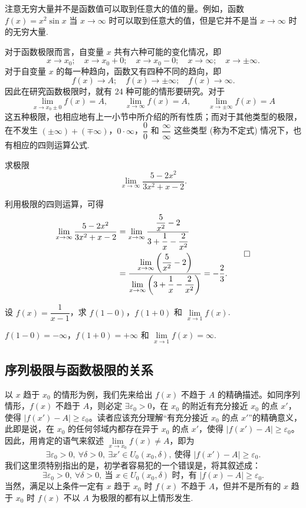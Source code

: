 注意无穷大量并不是函数值可以取到任意大的值的量。例如，函数 $f(x)=x^2\sin x$ 当 $x\to\infty$ 时可以取到任意大的值，但是它并不是当 $x\to\infty$ 时的无穷大量.

对于函数极限而言，自变量 $x$ 共有六种可能的变化情况，即
\[
  x\to x_0;\quad x\to x_0+0;\quad x\to x_0-0;\quad x\to\infty;\quad x\to\pm\infty.
\]
对于自变量 $x$ 的每一种趋向，函数又有四种不同的趋向，即
\[
  f(x)\to A;\quad f(x)\to\pm\infty;\quad f(x)\to\infty.
\]
因此在研究函数极限时，就有 24 种可能的情形要研究。对于
\[
  \lim_{x\to x_0\pm0}f(x)=A,\qquad
  \lim_{x\to\infty}f(x)=A,\qquad
  \lim_{x\to\pm\infty}f(x)=A
\]
这五种极限，也相应地有上一小节中所介绍的所有性质；而对于其他类型的极限，在不发生 $(\pm\infty)+(\mp\infty)$，$0\cdot\infty$，$\dfrac00$ 和 $\dfrac{\infty}{\infty}$ 这些类型 (称为不定式) 情况下，也有相应的四则运算公式.

\begin{example}\label{example:ma-3-1-10}
求极限
\[
  \lim_{x\to\infty}\frac{5-2x^2}{3x^2+x-2}.
\]
\end{example}


\begin{solve}
利用极限的四则运算，可得
\[
\begin{aligned}
  \lim_{x\to\infty}\frac{5-2x^2}{3x^2+x-2}
  &=\lim_{x\to\infty}\frac{\dfrac5{x^2}-2}{3+\dfrac1x-\dfrac2{x^2}}\\
  &=\frac{\lim\limits_{x\to\infty}\left(\dfrac5{x^2}-2\right)}
  {\lim\limits_{x\to\infty}\left(3+\dfrac1x-\dfrac2{x^2}\right)}
  =-\frac23.
\end{aligned}
\qedhere
\]
\end{solve}


\begin{example}\label{example:ma-3-1-11}
设 $f(x)=\dfrac1{x-1}$，求 $f(1-0)$，$f(1+0)$ 和 $\lim\limits_{x\to1}f(x)$.
\end{example}


\begin{solve}
$f(1-0)=-\infty$，$f(1+0)=+\infty$ 和 $\lim\limits_{x\to1}f(x)=\infty$.
\end{solve}


\subsection{序列极限与函数极限的关系}
\label{subsec:ma-3-1-4}

以 $x$ 趋于 $x_0$ 的情形为例，我们先来给出 $f(x)$ 不趋于 $A$ 的精确描述。如同序列情形，$f(x)$ 不趋于 $A$，则必定 $\exists\varepsilon_0>0$，在 $x_0$ 的附近有充分接近 $x_0$ 的点 $x'$，使得 $|f(x')-A|\geqslant\varepsilon_0$。读者应该充分理解``有充分接近 $x_0$ 的点 $x'$''的精确意义，此即是说，在 $x_0$ 的任何邻域内都存在异于 $x_0$ 的点 $x'$，使得 $|f(x')-A|\geqslant\varepsilon_0$。因此，用肯定的语气来叙述 $\lim\limits_{x\to x_0}f(x)\ne A$，即为
\[
  \exists\varepsilon_0>0,\ \forall\delta>0,\ \exists x'\in U_0(x_0,\delta),\ \text{使得 } |f(x')-A|\geqslant\varepsilon_0.
\]
我们这里须特别指出的是，初学者容易犯的一个错误是，将其叙述成：
\[
  \exists\varepsilon_0>0,\ \forall\delta>0,\ \text{当 }x\in U_0(x_0,\delta)\text{ 时，有 } |f(x)-A|\geqslant\varepsilon_0.
\]
当然，满足以上条件一定有 $x$ 趋于 $x_0$ 时 $f(x)$ 不趋于 $A$，但并不是所有的 $x$ 趋于 $x_0$ 时 $f(x)$ 不以 $A$ 为极限的都有以上情形发生.

